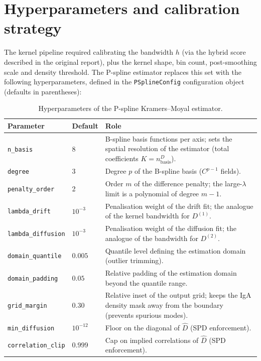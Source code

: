 \documentclass[11pt,a4paper]{article}
\newcommand{\Drift}{D^{(1)}}
\newcommand{\Diff}{D^{(2)}}
\begin{document}

\section{Hyperparameters and calibration strategy}
\label{sec:hyperparameters}

The kernel pipeline required calibrating the bandwidth $h$ (via the hybrid
score described in the original report), plus the kernel shape, bin count,
post-smoothing scale and density threshold. The P-spline estimator replaces
this set with the following hyperparameters, defined in the
\texttt{PSplineConfig} configuration object (defaults in parentheses):

\begin{table}[h]
\centering
\small
\begin{tabular}{@{}llp{6.8cm}@{}}
\toprule
Parameter & Default & Role \\
\midrule
\texttt{n\_basis} & 8 & B-spline basis functions per axis; sets the spatial
resolution of the estimator (total coefficients $K = n_{\text{basis}}^D$). \\
\texttt{degree} & 3 & Degree $p$ of the B-spline basis ($C^{p-1}$ fields). \\
\texttt{penalty\_order} & 2 & Order $m$ of the difference penalty; the
large-$\lambda$ limit is a polynomial of degree $m-1$. \\
\texttt{lambda\_drift} & $10^{-3}$ & Penalisation weight of the drift fit;
the analogue of the kernel bandwidth for $\Drift$. \\
\texttt{lambda\_diffusion} & $10^{-3}$ & Penalisation weight of the diffusion
fit; the analogue of the bandwidth for $\Diff$. \\
\texttt{domain\_quantile} & $0.005$ & Quantile level defining the estimation
domain (outlier trimming). \\
\texttt{domain\_padding} & $0.05$ & Relative padding of the estimation domain
beyond the quantile range. \\
\texttt{grid\_margin} & $0.30$ & Relative inset of the output grid; keeps the
IgA density mask away from the boundary (prevents spurious modes). \\
\texttt{min\_diffusion} & $10^{-12}$ & Floor on the diagonal of $\hat D$
(SPD enforcement). \\
\texttt{correlation\_clip} & $0.999$ & Cap on implied correlations of
$\hat D$ (SPD enforcement). \\
\bottomrule
\end{tabular}
\caption{Hyperparameters of the P-spline Kramers--Moyal estimator.}
\label{tab:hyperparameters}
\end{table}
\end{document}
